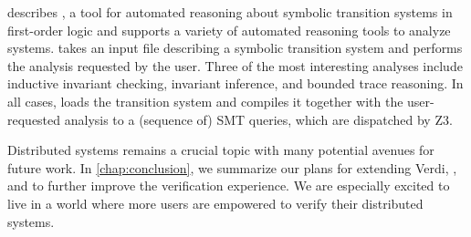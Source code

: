  describes \mypyvy, a tool for automated reasoning about
symbolic transition systems in first-order logic and supports a
variety of automated reasoning tools to analyze systems.
\mypyvy takes an input file describing a symbolic transition system
and performs the analysis requested by the user. Three of the most
interesting analyses include inductive invariant checking,
invariant inference, and bounded trace reasoning.
In all cases, \mypyvy loads the transition system and compiles
it together with the user-requested analysis to a (sequence of) SMT queries,
which are dispatched by Z3.

Distributed systems remains a crucial topic with many potential avenues
for future work. In \cref{chap:conclusion}, we summarize our plans for extending
Verdi, \disel, and \mypyvy to further improve the verification experience.
We are especially excited to live in a world where more users are
empowered to verify their distributed systems.